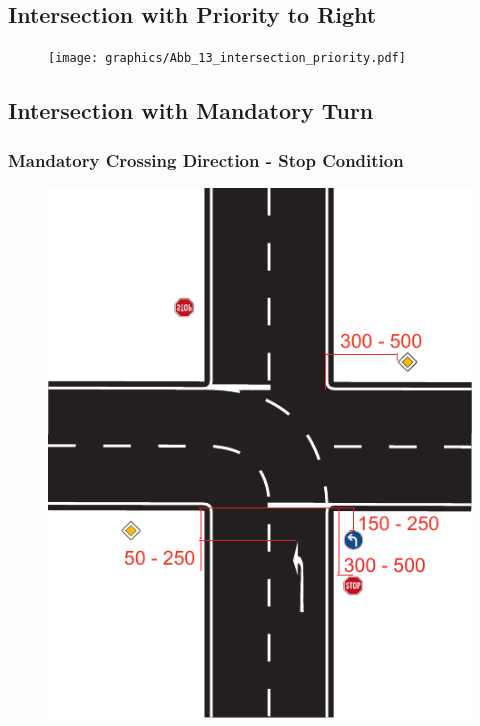 \subsection{Intersection with Priority to Right}
\label{fig_intersection_priority}
\begin{figure}[H]
	\begin{center}
		\centering\texttt{[image: graphics/Abb\_13\_intersection\_priority.pdf]}
	\end{center}
\end{figure}

\subsection{Intersection with Mandatory Turn}
\label{fig_intersection_mandatory}
\subsubsection{Mandatory Crossing Direction - Stop Condition}
\begin{figure}[H]
	\begin{center}
		\centering\includegraphics[scale=0.9]{graphics/Abb_14_mandatory_stop.pdf}
	\end{center}
\end{figure}

